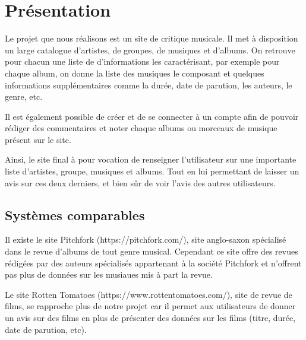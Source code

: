 \section{Présentation}

    \begin{paragraphe}
        Le projet que nous réalisons est un site de critique musicale.
        Il met à disposition un large catalogue d'artistes, de groupes, de musiques et d'albums.
        On retrouve pour chacun une liste de d'informations les caractérisant, par exemple pour chaque album,
        on donne la liste des musiques le composant et quelques informations supplémentaires comme la durée, date de parution, les auteurs, le genre, etc.
    \end{paragraphe}

    \begin{paragraphe}
        Il est également possible de créer et de se connecter à un compte afin de pouvoir rédiger des
        commentaires et noter chaque albums ou morceaux de musique présent sur le site.
    \end{paragraphe}

    \begin{paragraphe}
        Ainsi, le site final à pour vocation de renseigner l'utilisateur sur une importante liste d'artistes, groupe, musiques et albums.
        Tout en lui permettant de laisser un avis sur ces deux derniers, et bien sûr de voir l'avis des autres utilisateurs.
    \end{paragraphe}

    \subsection{Systèmes comparables}

        \begin{paragraphe}
            Il existe le site Pitchfork (https://pitchfork.com/), site anglo-saxon
            spécialisé dans le revue d’albums de tout genre musical. Cependant ce site
            offre des revues rédigées par des auteurs spécialisés appartenant à la
            société Pitchfork et n’offrent pas plus de données sur les musiaues mis à part
            la revue.
        \end{paragraphe}

        \begin{paragraphe}
            Le site Rotten Tomatoes (https://www.rottentomatoes.com/), site de revue de
            films, se rapproche plus de notre projet car il permet aux utilisateurs de
            donner un avis sur des films en plus de présenter des données sur les films
            (titre, durée, date de parution, etc).
        \end{paragraphe}

